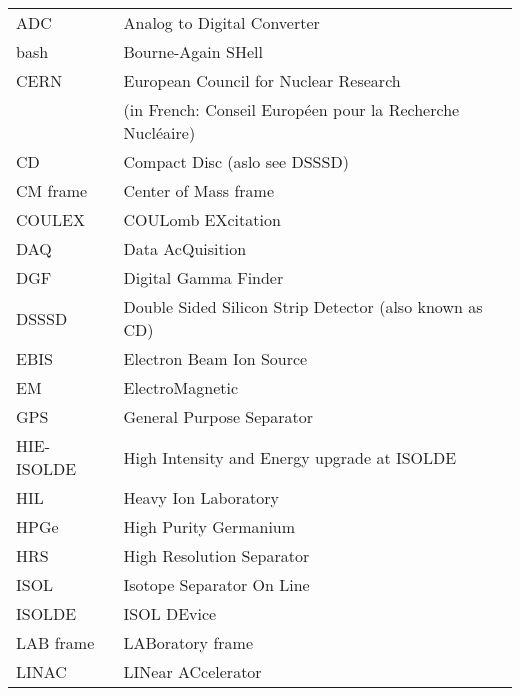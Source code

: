 \begin{tabular}{ll}
    \hline
    ADC         &  Analog to Digital Converter                                \\
    bash        &  Bourne-Again SHell                                         \\
    CERN        &  European Council for Nuclear Research                      \\
                &  (in French: Conseil Européen pour la Recherche Nucléaire)  \\
    CD          &  Compact Disc (aslo see DSSSD)                              \\
    CM frame    &  Center of Mass frame                                       \\
    COULEX      &  COULomb EXcitation                                         \\
    DAQ         &  Data AcQuisition                                           \\
    DGF         &  Digital Gamma Finder                                       \\
    DSSSD       &  Double Sided Silicon Strip Detector (also known as CD)     \\
    EBIS        &  Electron Beam Ion Source                                   \\
    EM          &  ElectroMagnetic                                            \\
    GPS         &  General Purpose Separator                                  \\
    HIE-ISOLDE  &  High Intensity and Energy upgrade at ISOLDE                \\
    HIL         &  Heavy Ion Laboratory                                       \\
    HPGe        &  High Purity Germanium                                      \\
    HRS         &  High Resolution Separator                                  \\
    ISOL        &  Isotope Separator On Line                                  \\
    ISOLDE      &  ISOL DEvice                                                \\
    LAB frame   &  LABoratory frame                                           \\
    LINAC       &  LINear ACcelerator                                         \\

\end{tabular}
